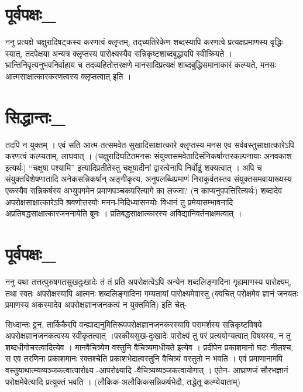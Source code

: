 \section*{पूर्वपक्षः\_}

ननु प्रत्यक्षे चक्षुरादिषट्कस्य करणत्वं क्लृप्तम्, तद्च्यतिरेकेण शब्दस्यापि करणत्वे प्रत्यक्षप्रमाणस्य वृद्धिः स्यात्, तदपेक्षया अन्यत्र क्लृप्तस्य पारोक्ष्यस्यैव सन्निकृष्टशाब्दबुद्धावपि स्वीक्रियते । भ्रान्तिनिवृत्यनुभवनिर्वाहाय च तदव्यहितोत्तरक्षणे मानसादिप्रत्यक्षं शाब्दबुद्धिसमानाकारं कल्प्यते, मनसः आत्मसाक्षात्कारकरणत्वस्य क्लृप्तत्वात् इति ।

\section*{सिद्धान्तः\_}

तदपि न युक्तम् । एवं सति आत्म-तत्समवेत-सुखादिसाक्षात्कारे क्लृप्तस्य मनस एव सर्ववस्तुसाक्षात्कारेऽपि करणत्वं कल्प्यताम्, लाघवात् । (चक्षुरादिघटितमनसः संयुक्तसमवेतादिसंनिकर्षान्तरकल्पनायाः अनवकाश इत्यर्थः) “चक्षुषा पश्यामि” इत्यादिप्रतीतेस्तु चक्षुषादीनां द्वारत्वेनापि निर्वोढुं शक्यत्वात् । अपि च संयुक्तविशेषणातादि अनेकसन्निकर्षान् अङ्गीकृत्य, अनुपलब्धिप्रमाणं निराकुर्वतस्तव संयुक्तसमवायाख्यस्य एकस्यैव सन्निकर्षस्य अभ्युपगमेन प्रमाणपञ्चकपरित्यागे का लज्जा? (न काप्यनुपपत्तिरित्यर्थः) शब्दादेव अपरोक्षसाक्षात्कारेऽपि श्रवणोत्तरयोः मनन-निदिध्यासनयोः विधानं तु प्रमेयासम्भावनादि अप्रतिबद्धसाक्षात्कारजननायेति ब्रूमः । प्रतिबद्धसाक्षात्कारस्य अविद्यानिवर्तनाक्षमत्वात् ।

\section*{पूर्वपक्षः\_}

ननु  यथा तत्तत्पुरुषगतसुखदुःखादेः तं तं प्रति अपरोक्षत्वेऽपि अन्येन शब्दलिङ्गादिना गृह्यमाणस्य पारोक्ष्यम्, तथा स्वतः अपरोक्षस्यापि आत्मनः शब्दलिङ्गादिना गम्यतायां पारोक्ष्यमेवास्तु (क्वचित् परोक्षमेव ज्ञानं जनयतः प्रमाणस्य अकस्मादेव अपरोक्षज्ञानजनकत्वं न युक्तमिति) इति चेत्-

सिध्दान्तः ट्टन, तार्किकैरपि वन्ह्याद्यनुमितिरूपपरोक्षज्ञानजनकरस्यापि परामर्शस्य सन्निकृष्टविषये अपरोक्षज्ञानजनकत्वस्य स्वीकृतत्वात् ।परकीयसुख-दुःखादेः पारोक्ष्यं तु परं प्रत्ययोग्यत्वात् विषयस्य, न तु शब्दधीगोचरत्वादित्येव । मानवैचित्र्येण वस्तुनि वैचित्र्यमाधीयते इत्येव । प्रदीपेन प्रकाशमानो घटः नीलश्च, स एव तरणिना प्रकाशमानः रक्तश्चेति प्रकाशभेदात्वस्तुनि वैचित्र्यं वस्तुतो न भवति । एवं प्रमाणानामपि वस्तुयाथात्म्यव्यञ्जकत्वात्पारोक्ष्य -आपरोक्ष्यादि -वैचित्र्यव्यञ्जकत्वायोगात् । एतेन- आघ्राणजं सौरभज्ञानं परोक्षमेवेत्यादि प्रत्युक्तं भवति । (लौकिक-अलौकिकसन्निकर्षभेदौ, तद्धेतू कल्प्येयाताम्)

